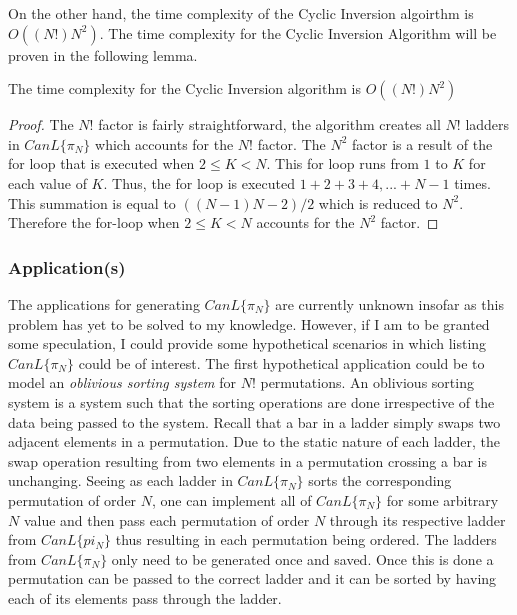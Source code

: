     On the other hand, the time complexity of the Cyclic Inversion algoirthm is $O((N!)N^{2})$. The time complexity for the Cyclic 
    Inversion Algorithm will be proven in the following lemma.

    \begin{lemma}
        The time complexity for the Cyclic Inversion algorithm is $O((N!)N^{2})$
    \end{lemma}
    \begin{proof}
        The $N!$ factor is fairly straightforward, the algorithm creates all $N!$ ladders in $CanL\{\pi_{N}\}$ which accounts 
        for the $N!$ factor. The $N^{2}$ factor is a result of the for loop that is executed when $2 \leq K < N$. This for loop runs 
        from $1$ to $K$ for each value of $K$. Thus, the for loop is executed $1 + 2 + 3 + 4, ... + N-1$ times. This summation 
        is equal to $((N-1)N-2)/2$ which is reduced to $N^{2}$. Therefore the for-loop when $2 \leq K < N$ accounts for the $N^{2}$
        factor.
    \end{proof}

    \subsubsection{Application(s)}
    The applications for generating $CanL\{\pi_{N}\}$ are currently unknown insofar as this problem has yet to be solved to my knowledge. 
    However, if I am to be granted some speculation, I could provide some hypothetical scenarios in which listing $CanL\{\pi_{N}\}$ could 
    be of interest. The first hypothetical application could be to model an \emph{oblivious sorting system} for $N!$ permutations. An oblivious 
    sorting system is a system such that the sorting operations are done irrespective of the data being passed to the system. Recall 
    that a bar in a ladder simply swaps two adjacent elements in a permutation. Due to the static nature of each ladder, the swap operation 
    resulting from two elements in a permutation crossing a bar is unchanging. 
    Seeing as each ladder in $CanL\{\pi_{N}\}$ sorts the corresponding permutation of order $N$, one can implement all of $CanL\{\pi_{N}\}$ 
    for some arbitrary $N$ value and then pass each permutation of order $N$ through its respective ladder from $CanL\{pi_{N}\}$ thus 
    resulting in each permutation being ordered. The ladders from $CanL\{\pi_{N}\}$ only need to be generated once and saved. Once this is done 
    a permutation can be passed to the correct ladder and it can be sorted by having each of its elements pass through the ladder. 